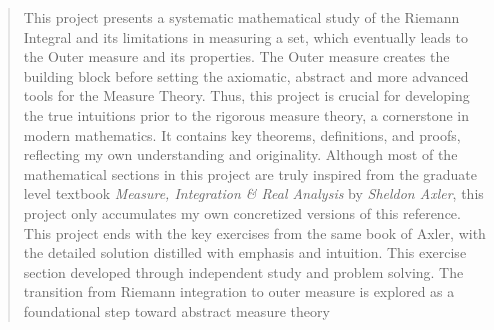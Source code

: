 \begin{abstract}
    This project presents a systematic mathematical study of the Riemann Integral and its limitations in measuring a set, which eventually leads to the Outer measure and its properties. The Outer measure creates the building block before setting the axiomatic, abstract and more advanced tools for the Measure Theory. Thus, this project is crucial for developing the true intuitions prior to the rigorous measure theory, a cornerstone in modern mathematics. It contains key theorems, definitions, and proofs, reflecting my own understanding and originality. Although most of the mathematical sections in this project are truly inspired from the graduate level textbook \textit{Measure, Integration \& Real Analysis} by \textit{Sheldon Axler}, this project only accumulates my own concretized versions of this reference. This project ends with the key exercises from the same book of Axler, with the detailed solution distilled with emphasis and intuition. This exercise section developed through independent study and problem solving. The transition from Riemann integration to outer measure is explored as a foundational step 
toward abstract measure theory
\end{abstract}